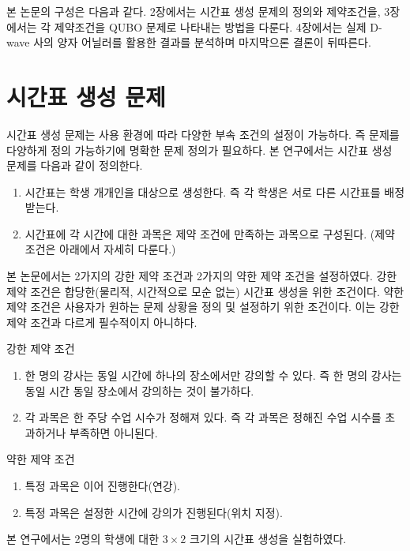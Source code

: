 \documentclass[12pt,a4paper]{article}
\begin{document}
    본 논문의 구성은 다음과 같다. 2장에서는 시간표 생성 문제의 정의와 제약조건을, 3장에서는 각 제약조건을 QUBO 문제로 나타내는 방법을 다룬다. 4장에서는 실제 D-wave 사의 양자 어닐러를 활용한 결과를 분석하며 마지막으론 결론이 뒤따른다.
    
\section{시간표 생성 문제}\label{sec:problem}

    시간표 생성 문제는 사용 환경에 따라 다양한 부속 조건의 설정이 가능하다. 즉 문제를 다양하게 정의 가능하기에 명확한 문제 정의가 필요하다. 본 연구에서는 시간표 생성 문제를 다음과 같이 정의한다.

    \begin{enumerate}
        \item 시간표는 학생 개개인을 대상으로 생성한다. 즉 각 학생은 서로 다른 시간표를 배정받는다.
        \item 시간표에 각 시간에 대한 과목은 제약 조건에 만족하는 과목으로 구성된다. (제약 조건은 아래에서 자세히 다룬다.)
    \end{enumerate}

    본 논문에서는 2가지의 강한 제약 조건과 2가지의 약한 제약 조건을 설정하였다. 강한 제약 조건은 합당한(물리적, 시간적으로 모순 없는) 시간표 생성을 위한 조건이다. 약한 제약 조건은 사용자가 원하는 문제 상황을 정의 및 설정하기 위한 조건이다. 이는 강한 제약 조건과 다르게 필수적이지 아니하다.

    강한 제약 조건
    
    \begin{enumerate}
        \item 한 명의 강사는 동일 시간에 하나의 장소에서만 강의할 수 있다. 즉 한 명의 강사는 동일 시간 동일 장소에서 강의하는 것이 불가하다.
        \item 각 과목은 한 주당 수업 시수가 정해져 있다. 즉 각 과목은 정해진 수업 시수를 초과하거나 부족하면 아니된다.
    \end{enumerate}

    약한 제약 조건
    
    \begin{enumerate}
        \item 특정 과목은 이어 진행한다(연강).
        \item 특정 과목은 설정한 시간에 강의가 진행된다(위치 지정).
    \end{enumerate}
    
    본 연구에서는 2명의 학생에 대한 $3\times2$ 크기의 시간표 생성을 실험하였다. 
\end{document}

